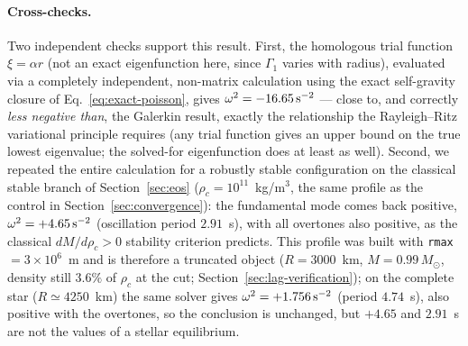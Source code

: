 \documentclass[11pt]{article}
\begin{document}
\paragraph{Cross-checks.} Two independent checks support this result. First, the homologous trial function $\xi=\alpha r$ (not an exact eigenfunction here, since $\Gamma_1$ varies with radius), evaluated via a completely independent, non-matrix calculation using the exact self-gravity closure of Eq.~\eqref{eq:exact-poisson}, gives $\omega^2=-16.65\,{\rm s}^{-2}$ — close to, and correctly \emph{less negative than}, the Galerkin result, exactly the relationship the Rayleigh--Ritz variational principle requires (any trial function gives an upper bound on the true lowest eigenvalue; the solved-for eigenfunction does at least as well). Second, we repeated the entire calculation for a robustly stable configuration on the classical stable branch of Section~\ref{sec:eos} ($\rho_c=10^{11}$~kg/m$^3$, the same profile as the control in Section~\ref{sec:convergence}): the fundamental mode comes back positive, $\omega^2=+4.65\,{\rm s}^{-2}$ (oscillation period $2.91$~s), with all overtones also positive, as the classical $dM/d\rho_c>0$ stability criterion predicts. This profile was built with \texttt{rmax}$=3\times10^{6}$~m and is therefore a truncated object ($R=3000$~km, $M=0.99\,M_\odot$, density still $3.6\%$ of $\rho_c$ at the cut; Section~\ref{sec:lag-verification}); on the complete star ($R\simeq4250$~km) the same solver gives $\omega^2=+1.756\,{\rm s}^{-2}$ (period $4.74$~s), also positive with the overtones, so the conclusion is unchanged, but $+4.65$ and $2.91$~s are not the values of a stellar equilibrium.
\end{document}
